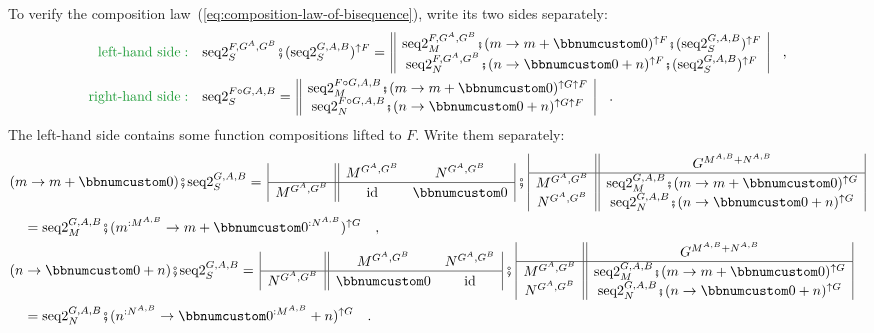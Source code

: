 To verify the composition law~(\ref{eq:composition-law-of-bisequence}),
write its two sides separately:
\begin{align*}
{\color{greenunder}\text{left-hand side}:}\quad & \text{seq2}_{S}^{F,G^{A},G^{B}}\bef(\text{seq2}_{S}^{G,A,B})^{\uparrow F}=\,\begin{array}{||c|}
\text{seq2}_{M}^{F,G^{A},G^{B}}\bef(m\rightarrow m+\bbnum 0)^{\uparrow F}\bef(\text{seq2}_{S}^{G,A,B})^{\uparrow F}\\
\text{seq2}_{N}^{F,G^{A},G^{B}}\bef(n\rightarrow\bbnum 0+n)^{\uparrow F}\bef(\text{seq2}_{S}^{G,A,B})^{\uparrow F}
\end{array}\quad,\\
{\color{greenunder}\text{right-hand side}:}\quad & \text{seq2}_{S}^{F\circ G,A,B}=\,\begin{array}{||c|}
\text{seq2}_{M}^{F\circ G,A,B}\bef(m\rightarrow m+\bbnum 0)^{\uparrow G\uparrow F}\\
\text{seq2}_{N}^{F\circ G,A,B}\bef(n\rightarrow\bbnum 0+n)^{\uparrow G\uparrow F}
\end{array}\quad.
\end{align*}
The left-hand side contains some function compositions lifted to $F$.
Write them separately:
\begin{align*}
 & (m\rightarrow m+\bbnum 0)\bef\text{seq2}_{S}^{G,A,B}=\,\begin{array}{|c||cc|}
 & M^{G^{A},G^{B}} & N^{G^{A},G^{B}}\\
\hline M^{G^{A},G^{B}} & \text{id} & \bbnum 0
\end{array}\,\bef\,\begin{array}{|c||c|}
 & G^{M^{A,B}+N^{A,B}}\\
\hline M^{G^{A},G^{B}} & \text{seq2}_{M}^{G,A,B}\bef(m\rightarrow m+\bbnum 0)^{\uparrow G}\\
N^{G^{A},G^{B}} & \text{seq2}_{N}^{G,A,B}\bef(n\rightarrow\bbnum 0+n)^{\uparrow G}
\end{array}\\
 & \quad=\text{seq2}_{M}^{G,A,B}\bef(m^{:M^{A,B}}\rightarrow m+\bbnum 0^{:N^{A,B}})^{\uparrow G}\quad,\\
 & (n\rightarrow\bbnum 0+n)\bef\text{seq2}_{S}^{G,A,B}=\,\begin{array}{|c||cc|}
 & M^{G^{A},G^{B}} & N^{G^{A},G^{B}}\\
\hline N^{G^{A},G^{B}} & \bbnum 0 & \text{id}
\end{array}\,\bef\,\begin{array}{|c||c|}
 & G^{M^{A,B}+N^{A,B}}\\
\hline M^{G^{A},G^{B}} & \text{seq2}_{M}^{G,A,B}\bef(m\rightarrow m+\bbnum 0)^{\uparrow G}\\
N^{G^{A},G^{B}} & \text{seq2}_{N}^{G,A,B}\bef(n\rightarrow\bbnum 0+n)^{\uparrow G}
\end{array}\\
 & \quad=\text{seq2}_{N}^{G,A,B}\bef(n^{:N^{A,B}}\rightarrow\bbnum 0^{:M^{A,B}}+n)^{\uparrow G}\quad.
\end{align*}
